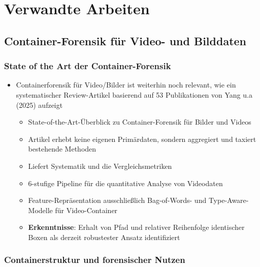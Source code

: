 \chapter{Verwandte Arbeiten}






\section{Container-Forensik für Video- und Bilddaten}



\subsection{State of the Art der Container-Forensik}

\begin{itemize}
    \item Containerforensik für Video/Bilder ist weiterhin noch relevant, wie ein systematischer Review-Artikel basierend auf 53 Publikationen von Yang u.a (2025) \cite{yang_comprehensive_2025} aufzeigt
    \begin{itemize}
        \item State-of-the-Art-Überblick zu Container-Forensik für Bilder und Videos
        \item Artikel erhebt keine eigenen Primärdaten, sondern aggregiert und taxiert bestehende Methoden
        \item Liefert Systematik und die Vergleichsmetriken
        \item 6-stufige Pipeline für die quantitative Analyse von Videodaten
        \item Feature-Repräsentation ausschließlich Bag-of-Words- und Type-Aware-Modelle für Video-Container  \cite[Kap. 4.3.4]{yang_comprehensive_2025}
        \item \textbf{Erkenntnisse}: Erhalt von Pfad und relativer Reihenfolge identischer Boxen als derzeit robustester Ansatz identifiziert
    \end{itemize}
\end{itemize}

\subsection{Containerstruktur und forensischer Nutzen}


